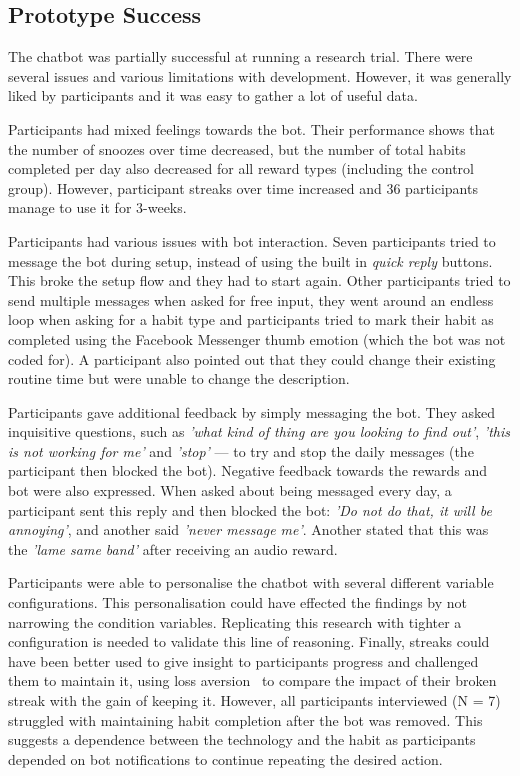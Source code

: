 \documentclass{scaffold/sigchi}
\begin{document}
\subsection{Prototype Success}
The chatbot was partially successful at running a research trial. There were several issues and various limitations with development. However, it was generally liked by participants and it was easy to gather a lot of useful data.

Participants had mixed feelings towards the bot. Their performance shows that the number of snoozes over time decreased, but the number of total habits completed per day also decreased for all reward types (including the control group). However, participant streaks over time increased and 36 participants manage to use it for 3-weeks.

Participants had various issues with bot interaction. Seven participants tried to message the bot during setup, instead of using the built in \textit{quick reply} buttons. This broke the setup flow and they had to start again. Other participants tried to send multiple messages when asked for free input, they went around an endless loop when asking for a habit type and participants tried to mark their habit as completed using the Facebook Messenger thumb emotion (which the bot was not coded for). A participant also pointed out that they could change their existing routine time but were unable to change the description.

Participants gave additional feedback by simply messaging the bot. They asked inquisitive questions, such as \textit{'what kind of thing are you looking to find out'}, \textit{'this is not working for me'} and \textit{'stop'} --- to try and stop the daily messages (the participant then blocked the bot). Negative feedback towards the rewards and bot were also expressed. When asked about being messaged every day, a participant sent this reply and then blocked the bot: \textit{'Do not do that, it will be annoying'}, and another said \textit{'never message me'}. Another stated that this was the \textit{'lame same band'} after receiving an audio reward.

Participants were able to personalise the chatbot with several different variable configurations. This personalisation could have effected the findings by not narrowing the condition variables. Replicating this research with tighter a configuration is needed to validate this line of reasoning. Finally, streaks could have been better used to give insight to participants progress and challenged them to maintain it, using loss aversion~\cite{loss_aversion} to compare the impact of their broken streak with the gain of keeping it. However, all participants interviewed (N = 7) struggled with maintaining habit completion after the bot was removed. This suggests a dependence between the technology and the habit as participants depended on bot notifications to continue repeating the desired action.
\end{document}
